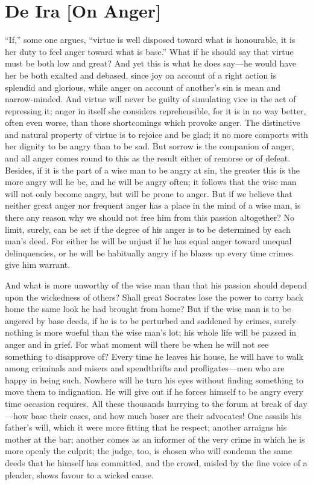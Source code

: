 
\author{Seneca}
\chapter[De Ira {[On Anger]}, bk. 2.6--2.10]{De Ira [On Anger]}

``If,'' some one argues, ``virtue is well disposed toward
what is honourable, it is her duty to feel anger toward what is
base.'' What if he should say that virtue must be both low and great?
And yet this is what he does say---he would have her be both exalted
and debased, since joy on account of a right action is splendid and
glorious, while anger on account of another's sin is mean and
narrow-minded.  And virtue will never be guilty of
simulating vice in the act of repressing it; anger in itself she
considers reprehensible, for it is in no way better, often even worse,
than those shortcomings which provoke anger. The distinctive and
natural property of virtue is to rejoice and be glad; it no more
comports with her dignity to be angry than to be sad. But sorrow is
the companion of anger, and all anger comes round to this as the
result either of remorse or of defeat. Besides, if it is the part of a
wise man to be angry at sin, the greater this is the more angry will
he be, and he will be angry often; it follows that the wise man will
not only become angry, but will be prone to anger. But if we believe
that neither great anger nor frequent anger has a place in the mind
of a wise man, is there any reason why we should not free him from
this passion altogether? No limit, surely, can be set if the degree of
his anger is to be determined by each man's deed. For either he will
be unjust if he has equal anger toward unequal delinquencies, or he
will be habitually angry if he blazes up every time crimes give him
warrant.

And what is more unworthy of the wise man than that his passion should
depend upon the wickedness of others? Shall great Socrates lose the
power to carry back home the same look he had brought from home? But
if the wise man is to be angered by base deeds, if he is to be
perturbed and saddened by crimes, surely nothing is more woeful than
the wise man's lot; his whole life will be passed in anger and in
grief. For what moment will there be when he will not see something to
disapprove of? Every time he leaves his house, he will have to walk
among criminals and misers and spendthrifts and 
prof\-li\-gates---men who are happy in being such. Nowhere will he
turn his eyes without finding something to move them to indignation.
He will give out if he forces himself to be angry every time occasion
requires. All these thousands hurrying to the forum at break of
day---how base their cases, and how much baser are their advocates!
One assails his father's will, which it were more fitting that he
respect; another arraigns his mother at the bar; another comes as an
informer of the very crime in which he is more openly the culprit; the
judge, too, is chosen who will condemn the same deeds that he himself
has committed, and the crowd, misled by the fine voice of a pleader,
shows favour to a wicked cause.

